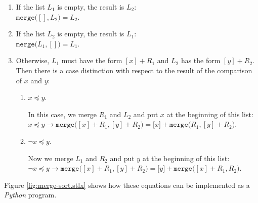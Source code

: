 \begin{enumerate}
\item If the list $L_1$ is empty, the result is $L_2$: \\[0.2cm]
      \hspace*{1.3cm} 
      $\mathtt{merge}\bigl([], L_2\bigr) = L_2$.
\item If the list $L_2$  is empty, the result is $L_1$: \\[0.2cm]
      \hspace*{1.3cm} 
      $\mathtt{merge}\bigl(L_1, []\bigr) = L_1$.
\item Otherwise, $L_1$ must have the form $[x] + R_1$ and $L_2$ has the form $[y] +R_2$.
      Then there is a case distinction with respect to the result of the comparison of $x$ and $y$:
      \begin{enumerate}
      \item $x \preceq y$.

            In this case, we merge $R_1$ and $L_2$ and put $x$ at the beginning of this list:
            \\[0.2cm]
            \hspace*{1.3cm} 
            $x \preceq y \rightarrow \mathtt{merge}\bigl([x] + R_1, [y] + R_2\bigr) = \bigl[x\bigr] +
               \mathtt{merge}\bigl(R_1,[y] + R_2\bigr)$.
      \item $\neg x \preceq y$.

            Now we merge $L_1$ and $R_2$ and put $y$ at the beginning of this list:
            \\[0.2cm]
            \hspace*{1.3cm} 
            $\neg x \preceq y \rightarrow \mathtt{merge}\bigl([x] + R_1, [y] + R_2\bigr) = \bigl[y \bigr] +
             \mathtt{merge}\bigl([x] + R_1,R_2\bigr)$.
      \end{enumerate}
\end{enumerate}

Figure \ref{fig:merge-sort.stlx} shows how these equations can be implemented as a \textsl{Python}
program.  


